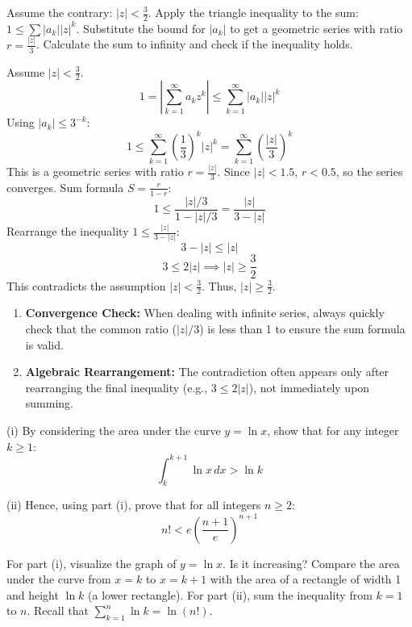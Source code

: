 \begin{hint}
Assume the contrary: $|z| < \frac{3}{2}$.
Apply the triangle inequality to the sum: $1 \le \sum |a_k| |z|^k$.
Substitute the bound for $|a_k|$ to get a geometric series with ratio $r = \frac{|z|}{3}$.
Calculate the sum to infinity and check if the inequality holds.
\end{hint}

\begin{solution}
Assume $|z| < \frac{3}{2}$.
\[ 1 = \left| \sum_{k=1}^\infty a_k z^k \right| \le \sum_{k=1}^\infty |a_k| |z|^k \]
Using $|a_k| \le 3^{-k}$:
\[ 1 \le \sum_{k=1}^\infty \left(\frac{1}{3}\right)^k |z|^k = \sum_{k=1}^\infty \left(\frac{|z|}{3}\right)^k \]
This is a geometric series with ratio $r = \frac{|z|}{3}$.
Since $|z| < 1.5$, $r < 0.5$, so the series converges.
Sum formula $S = \frac{r}{1-r}$:
\[ 1 \le \frac{|z|/3}{1 - |z|/3} = \frac{|z|}{3 - |z|} \]
Rearrange the inequality $1 \le \frac{|z|}{3 - |z|}$:
\[ 3 - |z| \le |z| \]
\[ 3 \le 2|z| \implies |z| \ge \frac{3}{2} \]
This contradicts the assumption $|z| < \frac{3}{2}$.
Thus, $|z| \ge \frac{3}{2}$.
\end{solution}

\begin{takeaways}
\begin{enumerate}
    \item \textbf{Convergence Check:} When dealing with infinite series, always quickly check that the common ratio ($|z|/3$) is less than 1 to ensure the sum formula is valid.
    \item \textbf{Algebraic Rearrangement:} The contradiction often appears only after rearranging the final inequality (e.g., $3 \le 2|z|$), not immediately upon summing.
\end{enumerate}
\end{takeaways}

\begin{problem}
(i) By considering the area under the curve $y = \ln x$, show that for any integer $k \ge 1$:
\[ \int_{k}^{k+1} \ln x \, dx > \ln k \]

(ii) Hence, using part (i), prove that for all integers $n \ge 2$:
\[ n! < e \left( \frac{n+1}{e} \right)^{n+1} \]
\end{problem}

\begin{hint}
For part (i), visualize the graph of $y = \ln x$. Is it increasing? Compare the area under the curve from $x=k$ to $x=k+1$ with the area of a rectangle of width 1 and height $\ln k$ (a lower rectangle).
For part (ii), sum the inequality from $k=1$ to $n$. Recall that $\sum_{k=1}^n \ln k = \ln(n!)$.
\end{hint}

